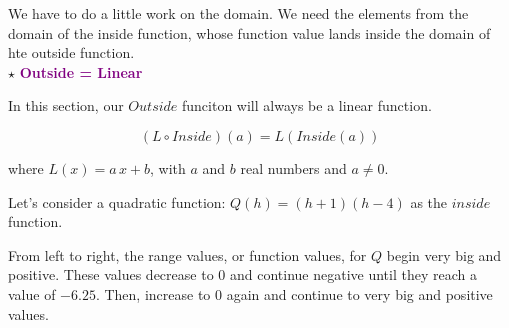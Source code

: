 \documentclass{ximera}
\begin{document}
We have to do a little work on the domain.  We need the elements from the domain of the inside function, whose function value lands inside the domain of hte outside function. \\





$\star$ \textbf{\textcolor{purple}{Outside = Linear}}


In this section, our $Outside$ funciton will always be a linear function.



\[      (L \circ Inside)(a) = L(Inside(a))        \]


where $L(x) = a \, x + b$, with $a$ and $b$ real numbers and $a \ne 0$.



Let's consider a quadratic function: $Q(h) = (h+1)(h-4)$ as the $inside$ function.











\begin{image}
\end{image}



From left to right, the range values, or function values, for $Q$ begin very big and positive.  These values decrease to $0$ and continue negative until they reach a value of $-6.25$. Then, increase to $0$ again and continue to very big and positive values.
\end{document}
